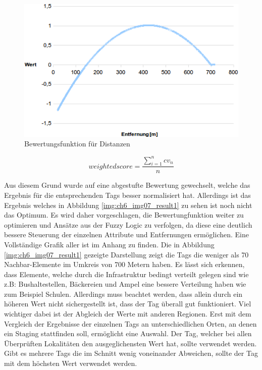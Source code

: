 \begin{figure}[H]
\begin{center}
\includegraphics[width=150mm]{images/ch6_img06_valued2.png}
\caption{Bewertungsfunktion für Distanzen}
\label{img:ch6_img06_valued2}
\end{center}
\end{figure}

\begin{equation}
weighted score = \frac{ \sum\limits_{i=1}^n cv_n }{n}
\end{equation}

Aus diesem Grund wurde auf eine abgestufte Bewertung gewechselt, welche das Ergebnis für die entsprechenden Tags besser normalisiert hat.
Allerdings ist das Ergebnis welches in Abbildung \ref{img:ch6_img07_result1} zu sehen ist noch nicht das Optimum. Es wird daher vorgeschlagen, die Bewertungfunktion weiter zu optimieren und Ansätze aus der Fuzzy Logic zu verfolgen, da diese eine deutlich bessere Steuerung der einzelnen Attribute und Entfernungen ermöglichen. Eine Vollständige Grafik aller ist im Anhang zu finden. Die in Abbildung \ref{img:ch6_img07_result1} gezeigte Darstellung zeigt die Tags die weniger als 70 Nachbar-Elemente im Umkreis von 700 Metern haben.
Es lässt sich erkennen, dass Elemente, welche durch die Infrastruktur bedingt verteilt gelegen sind wie z.B: Bushaltestellen, Bäckereien und Ampel eine bessere Verteilung haben wie zum Beispiel Schulen. Allerdings muss beachtet werden, dass allein durch ein höheren Wert nicht sichergestellt ist, dass der Tag überall gut funktioniert. Viel wichtiger dabei ist der Abgleich der Werte mit anderen Regionen. Erst mit dem Vergleich der Ergebnisse der einzelnen Tags an unterschiedlichen Orten, an denen ein Staging stattfinden soll, ermöglicht eine Auswahl.
Der Tag, welcher bei allen Überprüften Lokalitäten den ausgeglichensten Wert hat, sollte verwendet werden. Gibt es mehrere Tags die im Schnitt wenig voneinander Abweichen, sollte der Tag mit dem höchsten Wert verwendet werden. 

